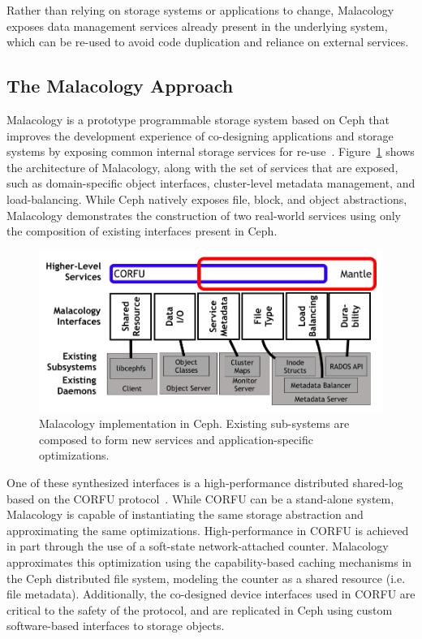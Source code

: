 Rather than relying on storage systems or applications to change, Malacology
exposes data management services already present in the underlying system,
which can be re-used to avoid code duplication and reliance on external
services.

\subsection{The Malacology Approach}
\label{mala}

Malacology is a prototype programmable storage system based on Ceph that
improves the development experience of co-designing applications and storage
systems by exposing common internal storage services for
re-use~\cite{sevilla:eurosys17}. Figure~\ref{fig:malacology} shows the
architecture of Malacology, along with the set of services that are exposed,
such as domain-specific object interfaces, cluster-level metadata management,
and load-balancing. While Ceph natively exposes file, block, and object
abstractions, Malacology demonstrates the construction of two real-world
services using only the composition of existing interfaces present in Ceph.

\begin{figure}[t]
\centering
\includegraphics[width=1.0\linewidth]{implementation-overview.png}
\caption{Malacology implementation in Ceph. Existing sub-systems are composed
    to form new services and application-specific optimizations.}
\label{fig:malacology}
\end{figure}

One of these synthesized interfaces is a high-performance distributed
shared-log
based on the CORFU protocol~\cite{balakrishnan:nsdi12}.  While CORFU can
be a stand-alone system, Malacology is capable of instantiating the same storage
abstraction and approximating the same optimizations. High-performance in CORFU
is achieved in part through the use of a soft-state network-attached counter.
Malacology approximates this optimization using the capability-based caching
mechanisms in the Ceph distributed file system, modeling the counter as a
shared resource (i.e. file metadata). Additionally, the co-designed device
interfaces used in CORFU are critical to the safety of the protocol, and are
replicated in Ceph using custom software-based interfaces to storage objects.

